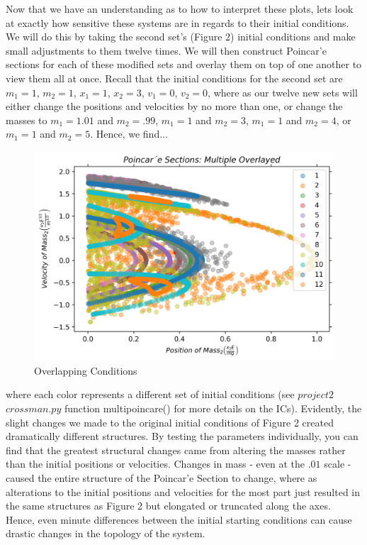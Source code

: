 \documentclass[twocolumn]{article}
\begin{document}
Now that we have an understanding as to how to interpret these plots, lets look at exactly how sensitive these systems are in regards to their initial conditions. We will do this by taking the second set's (Figure 2) initial conditions and make small adjustments to them twelve times. We will then construct Poincar'e sections for each of these modified sets and overlay them on top of one another to view them all at once. Recall that the initial conditions for the second set are $m_1=1$, $m_2=1$, $x_1=1$, $x_2=3$, $v_1=0$, $v_2=0$, where as our twelve new sets will either change the positions and velocities by no more than one, or change the masses to $m_1=1.01$ and $m_2=.99$, $m_1=1$ and $m_2=3$, $m_1=1$ and $m_2=4$, or $m_1=1$ and $m_2=5$. Hence, we find...
\begin{figure}[H]
\caption{Overlapping Conditions}
\centering
\includegraphics[scale=.5]{Section-MultiConditions1}
\end{figure}
\hspace{-3.8mm}where each color represents a different set of initial conditions (see $project2$\textunderscore$crossman.py$ function multipoincare() for more details on the ICs). Evidently, the slight changes we made to the original initial conditions of Figure 2 created dramatically different structures. By testing the parameters individually, you can find that the greatest structural changes came from altering the masses rather than the initial positions or velocities. Changes in mass - even at the $.01$ scale - caused the entire structure of the Poincar'e Section to change, where as alterations to the initial positions and velocities for the most part just resulted in the same structures as Figure 2 but elongated or truncated along the axes. Hence, even minute differences between the initial starting conditions can cause drastic changes in the topology of the system.
\end{document}
